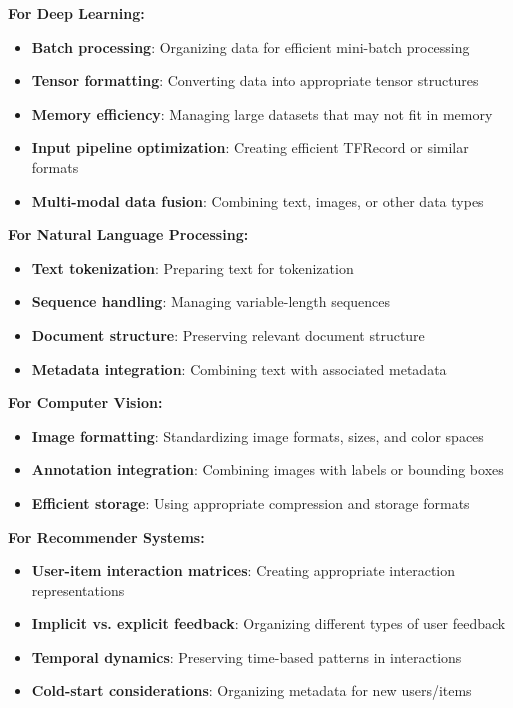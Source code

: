 \documentclass[12pt]{article}
\begin{document}
\begin{enumerate}
\begin{tcolorbox}[colback=blue!5!white,colframe=blue!75!black,title={Solution}]
    \textbf{For Deep Learning:}
    \begin{itemize}
        \item \textbf{Batch processing}: Organizing data for efficient mini-batch processing
        \item \textbf{Tensor formatting}: Converting data into appropriate tensor structures
        \item \textbf{Memory efficiency}: Managing large datasets that may not fit in memory
        \item \textbf{Input pipeline optimization}: Creating efficient TFRecord or similar formats
        \item \textbf{Multi-modal data fusion}: Combining text, images, or other data types
    \end{itemize}
    
    \textbf{For Natural Language Processing:}
    \begin{itemize}
        \item \textbf{Text tokenization}: Preparing text for tokenization
        \item \textbf{Sequence handling}: Managing variable-length sequences
        \item \textbf{Document structure}: Preserving relevant document structure
        \item \textbf{Metadata integration}: Combining text with associated metadata
    \end{itemize}
    
    \textbf{For Computer Vision:}
    \begin{itemize}
        \item \textbf{Image formatting}: Standardizing image formats, sizes, and color spaces
        \item \textbf{Annotation integration}: Combining images with labels or bounding boxes
        \item \textbf{Efficient storage}: Using appropriate compression and storage formats
    \end{itemize}
    
    \textbf{For Recommender Systems:}
    \begin{itemize}
        \item \textbf{User-item interaction matrices}: Creating appropriate interaction representations
        \item \textbf{Implicit vs. explicit feedback}: Organizing different types of user feedback
        \item \textbf{Temporal dynamics}: Preserving time-based patterns in interactions
        \item \textbf{Cold-start considerations}: Organizing metadata for new users/items
    \end{itemize}
    

\end{tcolorbox}
\end{enumerate}
\end{document}
